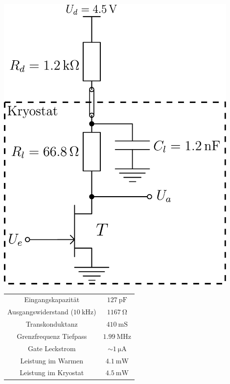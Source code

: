 \begin{minipage}[!b]{\textwidth}
\begin{minipage}[c]{0.4\textwidth}
\includegraphics[width=0.9\textwidth]{./fig/Amp.pdf}
\end{minipage}
\begin{minipage}[c]{0.6\textwidth}
\begin{minipage}[c]{0.5\textwidth}
  \begin{tabular}{cc} \toprule
  Eingangskapazität & $\SI{127}{\pico\farad}$ \\ 
  Ausgangswiderstand ($\SI{10}{\kilo\hertz}$) & $\SI{1167}{\ohm}$ \\
  Transkonduktanz & $\SI{410}{\milli\siemens}$\\
  Grenzfrequenz Tiefpass & $\SI{1.99}{\mega\hertz}$\\
  Gate Leckstrom & $\sim\SI{1}{\micro\ampere}$ \\
  Leistung im Warmen &  $\SI{4.1}{\milli\watt}$\\
  Leistung im Kryostat &  $\SI{4.5}{\milli\watt}$\\ \bottomrule
 	\end{tabular}
\end{minipage} \\

\end{minipage}
\end{minipage}
